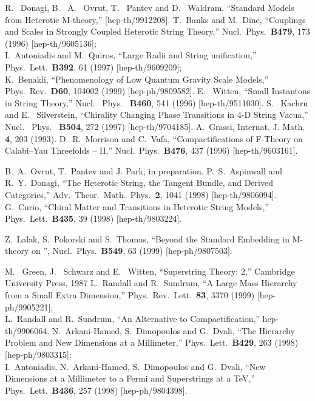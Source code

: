 \documentclass[a4paper,12pt]{article}
\numberwithin{equation}{section}
\theoremstyle{plain}
\begin{document}
\begin{thebibliography}{99}
   R. ~Donagi, B. ~A. ~Ovrut, T. ~Pantev and D. ~Waldram,
   ``Standard Models from Heterotic M-theory,''
   [hep-th/9912208].
   T.~Banks and M.~Dine,
   ``Couplings and Scales in Strongly Coupled Heterotic String Theory,''
   Nucl.\ Phys.\  {\bf B479}, 173 (1996)
   [hep-th/9605136];
   \\
   I.~Antoniadis and M.~Quiros,
   ``Large Radii and String unification,''
   Phys.\ Lett.\  {\bf B392}, 61 (1997)
   [hep-th/9609209];
   \\
   K.~Benakli,
   ``Phenomenology of Low Quantum Gravity Scale Models,''
   Phys.\ Rev.\  {\bf D60}, 104002 (1999)
   [hep-ph/9809582].
   E. ~Witten, ``Small Instantons in String Theory,''
   Nucl. \ Phys. \ {\bf B460}, 541 (1996)
   [hep-th/9511030].
   S. ~Kachru and E. ~Silverstein, ``Chirality Changing Phase Transitions
   in 4-D String Vacua,''
   Nucl. \ Phys. \ {\bf B504}, 272 (1997)
   [hep-th/9704185].
   A.~Grassi,
   Internat. J. Math. {\bf 4}, 203 (1993).
   D.~R.~Morrison and C.~Vafa,
   ``Compactifications of F-Theory on Calabi--Yau Threefolds -- II,''
   Nucl.\ Phys.\  {\bf B476}, 437 (1996)
   [hep-th/9603161].

   B.~A.~Ovrut, T.~Pantev and J. Park,
   in preparation. 
   P.~S.~Aspinwall and R.~Y.~Donagi,
   ``The Heterotic String, the Tangent Bundle, and Derived Categories,''
   Adv.\ Theor.\ Math.\ Phys.\  {\bf 2}, 1041 (1998)
   [hep-th/9806094].
   G.~Curio,
   ``Chiral Matter and Transitions in Heterotic String Models,''
   Phys.\ Lett.\  {\bf B435}, 39 (1998)
   [hep-th/9803224].

   Z.~Lalak, S.~Pokorski and S.~Thomas,
   ``Beyond the Standard Embedding in M-theory on \coordHE{}'',
   Nucl.\ Phys.\  {\bf B549}, 63 (1999)
   [hep-ph/9807503].


   M. ~Green, J. ~Schwarz and E. ~Witten, ``Superstring Theory: 2,''
   Cambridge University Press, 1987
   L.~Randall and R.~Sundrum,
   ``A Large Mass Hierarchy from a Small Extra Dimension,''
   Phys.\ Rev.\ Lett.\  {\bf 83}, 3370 (1999)
   [hep-ph/9905221];
   \\
   L.~Randall and R.~Sundrum,
   ``An Alternative to Compactification,''
   hep-th/9906064.
   N.~Arkani-Hamed, S.~Dimopoulos and G.~Dvali,
   ``The Hierarchy Problem and New Dimensions at a Millimeter,''
   Phys.\ Lett.\  {\bf B429}, 263 (1998)
   [hep-ph/9803315];
   \\
   I.~Antoniadis, N.~Arkani-Hamed, S.~Dimopoulos and G.~Dvali,
   ``New Dimensions at a Millimeter to a Fermi and Superstrings at a TeV,''
   Phys.\ Lett.\  {\bf B436}, 257 (1998)
   [hep-ph/9804398].



\end{thebibliography}
\end{document}
